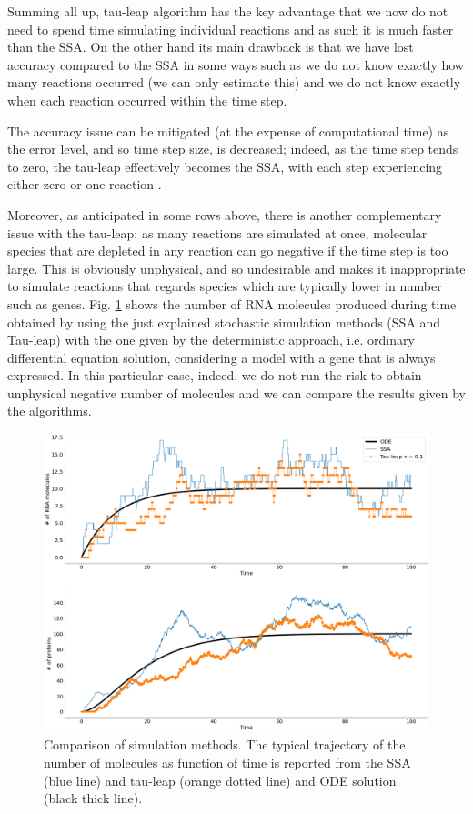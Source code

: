 \documentclass[12pt,a4paper]{report}
\begin{document}
Summing all up, tau-leap algorithm has the key advantage that we now do not need to spend time simulating individual reactions and as such it is much faster than the SSA. On the other hand its main drawback is that we have lost accuracy compared to the SSA in some ways such as we do not know exactly how many reactions occurred (we can only estimate this) and we do not know exactly when each reaction occurred within the time step.


The accuracy issue can be mitigated (at the expense of computational time) as the error level, and so time step size, is decreased; indeed, as the time step tends to zero, the tau-leap effectively becomes the SSA, with each step experiencing either zero or one reaction \cite{Article}. 


Moreover, as anticipated in some rows above, there is another complementary issue with the tau-leap: as many reactions are simulated at once, molecular species that are depleted in any reaction can go negative if the time step is too large. This is obviously unphysical, and so undesirable and makes it inappropriate to simulate reactions that regards species which are typically lower in number such as genes. Fig. \ref{ODESSATAULEAP} shows the number of RNA molecules produced during time obtained by using the just explained stochastic simulation methods (SSA and Tau-leap) with the one given by the deterministic approach, i.e. ordinary differential equation solution, considering a model with a gene that is always expressed. In this particular case, indeed, we do not run the risk to obtain unphysical negative number of molecules and we can compare the results given by the algorithms.

\begin{figure}[!ht]
\centering
\includegraphics[scale=0.30]{ODESSATauleaptimeplot100.png}
\caption{Comparison of simulation methods. The typical trajectory of the number of molecules as function of time is reported from the SSA (blue line) and tau-leap (orange dotted line) and ODE solution (black thick line).}
\label{ODESSATAULEAP}
\end{figure}
\end{document}
